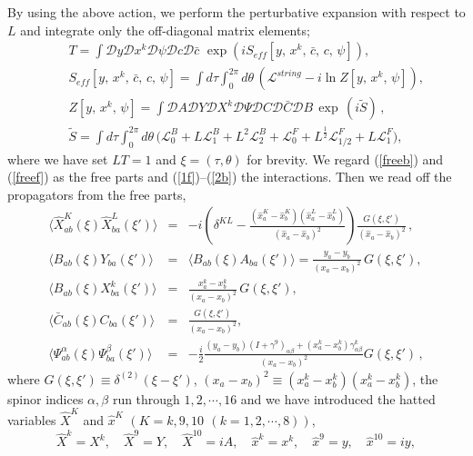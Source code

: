 \documentclass[a4paper,12pt]{article}
\newcommand{\calL}{\mathcal{L}}
\newcommand{\calD}{\mathcal{D}}
\newcommand{\vev}[1]{\langle #1 \rangle}
\begin{document}
By using the above action, we perform the perturbative expansion with
respect to $L$ and integrate only the off-diagonal matrix elements;
\begin{eqnarray}
  &&T=\int \calD y \calD x^k \calD\psi \calD c \calD\bar{c}\,\,
	\exp\left(iS_{eff}[y,\,x^k,\,\bar{c},\,c,\,\psi]\right),\\
  &&S_{eff}[y,\,x^k,\,\bar{c},\,c,\,\psi]=\int d\tau \int_0^{2\pi}
	d\theta\, \left(\calL^{string}
	-i\ln Z[y,\,x^k,\,\psi]\right),\label{eff}\\
  &&Z[y,\,x^k,\,\psi]=\int \calD A \calD Y \calD X^k \calD\Psi\calD C
	\calD\bar{C}\calD B\,\exp \,(i\tilde{S})\,,\label{Z}\\
  &&\tilde{S}= \int d\tau \int_0^{2\pi} d\theta\,
	\Big(\calL^B_0 +L\calL^B_1 + L^2\calL^B_2
      +\calL^F_0 +L^{\frac{1}{2}}\calL^F_{1/2} +L\calL^F_1\Big),
\end{eqnarray}
where we have set $LT=1$ and $\xi=(\tau,\theta)$ for brevity.
We regard (\ref{freeb}) and (\ref{freef}) as the
free parts and (\ref{1f})--(\ref{2b}) the interactions.
Then we read off the propagators from the free parts,
\begin{eqnarray}
  \vev{\hat{X}_{ab}^K(\xi)\hat{X}_{ba}^L(\xi')}
    &=&-i\left(\delta^{KL}-\frac{(\hat{x}_a^K
    -\hat{x}_b^K)(\hat{x}_a^L-\hat{x}_b^L)}{(\hat{x}_a-\hat{x}_b)^2}
    \right)\frac{G(\xi,\xi')}{(\hat{x}_a-\hat{x}_b)^2}\,,\label{pro}\\
  \vev{B_{ab}(\xi)Y_{ba}(\xi')} &=&\vev{B_{ab}(\xi)A_{ba}(\xi')} =
	\frac{y_a-y_b}{(x_a-x_b)^2}\,G(\xi,\xi'),\\
  \vev{B_{ab}(\xi)X_{ba}^k(\xi')}&=&
	\frac{x_a^k-x_b^k}{(x_a-x_b)^2}\,G(\xi,\xi'),\\
  \vev{\bar{C}_{ab}(\xi)C_{ba}(\xi')}&=&
	\frac{G(\xi,\xi')}{(x_a-x_b)^2},\\
  \vev{\Psi_{ab}^{\alpha}(\xi)\Psi_{ba}^{\beta}(\xi')}&=& -\frac{i}{2}
	\frac{(y_a-y_b)(I+\gamma^9)_{\alpha\beta}
	+(x_a^k-x_b^k)\gamma^k_{\alpha\beta}}{(x_a-x_b)^2}G(\xi,\xi')\,
	\label{psipsi},
\end{eqnarray}
where $G(\xi,\xi')\equiv \delta^{(2)}(\xi-\xi')$,
$(x_a-x_b)^2\equiv(x_{a}^k-x_b^k)(x_{a}^k-x_b^k)$,
the spinor indices $\alpha,\beta$ run through $1,2,\cdots,16$
and we have introduced the hatted variables $\hat{X}^K$ and
$\hat{x}^K$ $(K=k,9,10\,\ (k = 1,2,\cdots,8))$,
\begin{equation}
  \hat{X}^k=X^k,\quad\hat{X}^9=Y,\quad\hat{X}^{10}=iA,\quad
  \hat{x}^k=x^k,\quad\hat{x}^9=y,\quad\hat{x}^{10}=iy,\label{hatX}
\end{equation}
\end{document}
